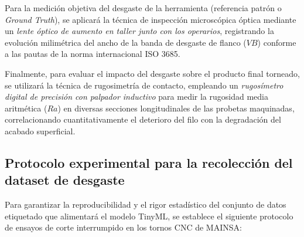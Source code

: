 Para la medición objetiva del desgaste de la herramienta (referencia patrón o \textit{Ground Truth}), se aplicará la técnica de inspección microscópica óptica mediante un \textit{lente óptico de aumento en taller junto con los operarios}, registrando la evolución milimétrica del ancho de la banda de desgaste de flanco ($VB$) conforme a las pautas de la norma internacional ISO 3685.

Finalmente, para evaluar el impacto del desgaste sobre el producto final torneado, se utilizará la técnica de rugosimetría de contacto, empleando un \textit{rugosímetro digital de precisión con palpador inductivo} para medir la rugosidad media aritmética ($Ra$) en diversas secciones longitudinales de las probetas maquinadas, correlacionando cuantitativamente el deterioro del filo con la degradación del acabado superficial.


\subsection{Protocolo experimental para la recolección del dataset de desgaste}

Para garantizar la reproducibilidad y el rigor estadístico del conjunto de datos etiquetado que alimentará el modelo TinyML, se establece el siguiente protocolo de ensayos de corte interrumpido en los tornos CNC de MAINSA:

